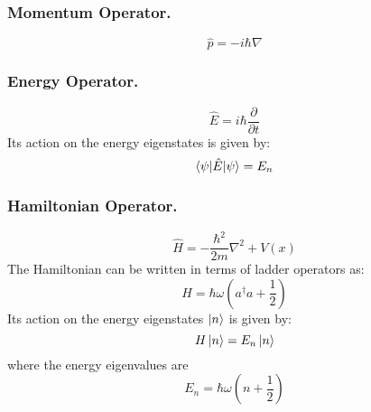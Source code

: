 \documentclass[../../../main.tex]{subfiles}
\begin{document}
\subsubsection{Momentum Operator.} 
\begin{equation*}
    \hat{p}= -i\hbar\nabla
\end{equation*}

\subsubsection{Energy Operator.} 
\begin{equation*}
    \hat{E}=i \hbar \frac{\partial}{\partial t}
\end{equation*}
Its action on the energy eigenstates is given by:
\begin{equation*}
    \braket{\psi|\hat{E}|\psi}=E_n
\end{equation*}

\subsubsection{Hamiltonian Operator.}
\begin{equation*}
    \hat{H}=-\frac{\hbar^2}{2m}\nabla^2 +V(x)
\end{equation*}
The Hamiltonian can be written in terms of ladder operators as:
\begin{equation*}
H = \hbar\omega \left( a^\dagger a + \frac{1}{2} \right)
\end{equation*}
Its action on the energy eigenstates $\ket{n}$ is given by:
\begin{equation*}
    H \ket{n} = E_n\ket{n}
\end{equation*}
where the energy eigenvalues are
\begin{equation*}
    E_n=\hbar\omega\left(n+\frac{1}{2}\right)
\end{equation*}
\end{document}
